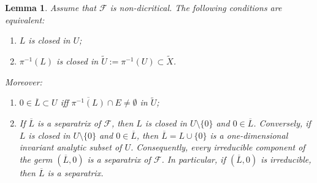 \documentclass[11pt,twoside]{amsart}
\newcommand{\F}{\mathcal F}
\newtheorem{lema}{Lemma}
\theoremstyle{definition}
\begin{document}
\begin{lema}
\label{lemma:4}\normalfont Assume that $\F$ is non-dicritical. The following conditions are equivalent:
\begin{enumerate}
\item[(i)] $L$ is closed in $U$;
\item[(ii)] $\pi^{-1}(L)$ is closed in $\widetilde U:=\pi^{-1}(U)\subset\widetilde X$.
\end{enumerate}
Moreover:
\begin{enumerate}
\item[(a)] $0\in\overline{L}\subset U$ iff $\overline{\pi^{-1}(L)}\cap E\neq\emptyset$ in $\widetilde U$;

\item[(b)] If $\overline L$ is a separatrix of $\F$, then $L$ is
closed in $U\setminus\{0\}$ and $0\in\overline L$. Conversely, if
$L$ is closed in $U\setminus\{0\}$ and $0\in\overline L$, then
$\overline L=L\cup\{0\}$ is a one-dimensional invariant analytic
subset of $U$. Consequently, every irreducible component of the germ
$(\overline L,0)$ is a separatrix of $\F$. In particular, if
$(\overline L,0)$ is irreducible, then $\overline L$ is a separatrix.
\end{enumerate}
\end{lema}
\end{document}
